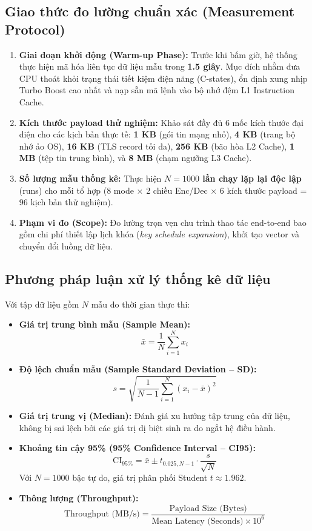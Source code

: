 \documentclass[12pt, a4paper]{report}
\begin{document}
\subsection{Giao thức đo lường chuẩn xác (Measurement Protocol)}
\begin{enumerate}
    \item \textbf{Giai đoạn khởi động (Warm-up Phase):} Trước khi bấm giờ, hệ thống thực hiện mã hóa liên tục dữ liệu mẫu trong \textbf{1.5 giây}. Mục đích nhằm đưa CPU thoát khỏi trạng thái tiết kiệm điện năng (C-states), ổn định xung nhịp Turbo Boost cao nhất và nạp sẵn mã lệnh vào bộ nhớ đệm L1 Instruction Cache.
    \item \textbf{Kích thước payload thử nghiệm:} Khảo sát đầy đủ 6 mốc kích thước đại diện cho các kịch bản thực tế: \textbf{1 KB} (gói tin mạng nhỏ), \textbf{4 KB} (trang bộ nhớ ảo OS), \textbf{16 KB} (TLS record tối đa), \textbf{256 KB} (bão hòa L2 Cache), \textbf{1 MB} (tệp tin trung bình), và \textbf{8 MB} (chạm ngưỡng L3 Cache).
    \item \textbf{Số lượng mẫu thống kê:} Thực hiện \textbf{$N = 1000$ lần chạy lặp lại độc lập} (runs) cho mỗi tổ hợp (8 mode $\times$ 2 chiều Enc/Dec $\times$ 6 kích thước payload = 96 kịch bản thử nghiệm).
    \item \textbf{Phạm vi đo (Scope):} Đo lường trọn vẹn chu trình thao tác end-to-end bao gồm chi phí thiết lập lịch khóa (\textit{key schedule expansion}), khởi tạo vector và chuyển đổi luồng dữ liệu.
\end{enumerate}

\subsection{Phương pháp luận xử lý thống kê dữ liệu}
Với tập dữ liệu gồm $N$ mẫu đo thời gian thực thi:
\begin{itemize}
    \item \textbf{Giá trị trung bình mẫu (Sample Mean):}
    \[ \bar{x} = \frac{1}{N} \sum_{i=1}^N x_i \]
    \item \textbf{Độ lệch chuẩn mẫu (Sample Standard Deviation -- SD):}
    \[ s = \sqrt{\frac{1}{N - 1} \sum_{i=1}^N (x_i - \bar{x})^2} \]
    \item \textbf{Giá trị trung vị (Median):} Đánh giá xu hướng tập trung của dữ liệu, không bị sai lệch bởi các giá trị dị biệt sinh ra do ngắt hệ điều hành.
    \item \textbf{Khoảng tin cậy 95\% (95\% Confidence Interval -- CI95):}
    \[ \text{CI}_{95\%} = \bar{x} \pm t_{0.025, N-1} \cdot \frac{s}{\sqrt{N}} \]
    Với $N = 1000$ bậc tự do, giá trị phân phối Student $t \approx 1.962$.
    \item \textbf{Thông lượng (Throughput):}
    \[ \text{Throughput (MB/s)} = \frac{\text{Payload Size (Bytes)}}{\text{Mean Latency (Seconds)} \times 10^6} \]
\end{itemize}
\end{document}
